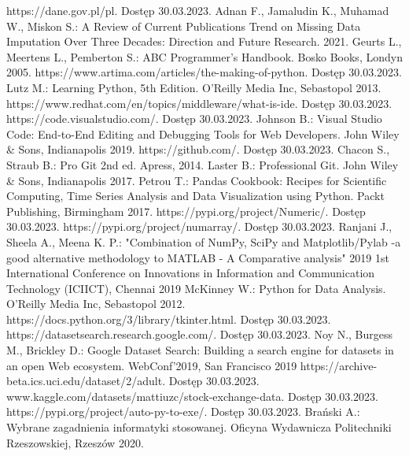 \documentclass[12pt,twoside]{article}
\begin{document}
\begin{thebibliography}{4}
     https://dane.gov.pl/pl. Dostęp 30.03.2023.
     Adnan F., Jamaludin K., Muhamad W., Miskon S.: A Review of Current Publications Trend on Missing Data Imputation Over Three Decades: Direction and Future Research. 2021.
     Geurts L., Meertens L., Pemberton S.: ABC Programmer's Handbook. Bosko Books, Londyn 2005.
     https://www.artima.com/articles/the-making-of-python. Dostęp 30.03.2023.
     Lutz M.: Learning Python, 5th Edition. O'Reilly Media Inc, Sebastopol 2013.
     https://www.redhat.com/en/topics/middleware/what-is-ide. Dostęp 30.03.2023.
     https://code.visualstudio.com/. Dostęp 30.03.2023.
     Johnson B.: Visual Studio Code: End-to-End Editing and Debugging Tools for Web Developers. John Wiley \& Sons, Indianapolis 2019.
     https://github.com/. Dostęp 30.03.2023.
     Chacon S., Straub B.: Pro Git 2nd ed. Apress, 2014.
     Laster B.: Professional Git. John Wiley \& Sons, Indianapolis 2017.
     Petrou T.: Pandas Cookbook: Recipes for Scientific Computing, Time Series Analysis and Data Visualization using Python. Packt Publishing, Birmingham 2017.
     https://pypi.org/project/Numeric/. Dostęp 30.03.2023.
     https://pypi.org/project/numarray/. Dostęp 30.03.2023.
     Ranjani J., Sheela A., Meena K. P.: "Combination of NumPy, SciPy and Matplotlib/Pylab -a good alternative methodology to MATLAB - A Comparative analysis" 2019 1st International Conference on Innovations in Information and Communication Technology (ICIICT), Chennai 2019
     McKinney W.: Python for Data Analysis. O'Reilly Media Inc, Sebastopol 2012.
     https://docs.python.org/3/library/tkinter.html. Dostęp 30.03.2023.
     https://datasetsearch.research.google.com/. Dostęp 30.03.2023.
     Noy N., Burgess M., Brickley D.: Google Dataset Search: Building a search engine for datasets in an open Web ecosystem. WebConf'2019, San Francisco 2019
     https://archive-beta.ics.uci.edu/dataset/2/adult. Dostęp 30.03.2023.
     www.kaggle.com/datasets/mattiuzc/stock-exchange-data. Dostęp 30.03.2023.
     https://pypi.org/project/auto-py-to-exe/. Dostęp 30.03.2023.
     Brański A.: Wybrane zagadnienia informatyki stosowanej. Oficyna Wydawnicza Politechniki Rzeszowskiej, Rzeszów 2020.
\end{thebibliography}

\clearpage


\makesummary
\end{document}

